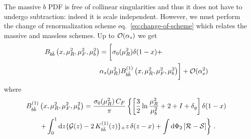 The massive $b$ PDF is free of collinear singularities and thus it
does
not have to
undergo subtraction: indeed it is scale independent.
However, we must perform the change of
renormalization scheme eq.~\eqref{eq:change-of-scheme} which relates
the massive and massless schemes.
Up to ${\cal O}(\alpha_s)$ we get
\begin{align}
  B_{b\bar{b}}\left(x,\mu_R^2,\mu_F^2 ,\mu_b^2\right) &= 
  \biggl[ \sigma_0(\mu_R^2) \delta(1-x) + \nonumber \\ &\alpha_s(\mu_R^2)
    B_{b\bar{b}}^{(1)}\left(x,\mu_R^2,\mu_F^2 ,\mu_b^2\right) \biggr]
  +{\cal O}(\alpha_s^2)
\end{align}
where
\begin{equation}
  \begin{split}
  B_{b\bar{b}}^{(1)}&\left(x,\mu_R^2,\mu_F^2 ,\mu_b^2\right) =
  \frac{\sigma_0(\mu_R^2)\,C_F}{\pi}
  \left\{
    \left[
      \frac{3}{2}\ln\frac{\mu_R^2}{\mu_b^2}+2 + I + \delta_g
    \right]\delta(1-x) \right.\\
  &\left.
   + \int_0^1{\rm d}z \{{\cal G}(z) - 2\,K_{b\bar{b}}^{(1)}(z)\}_+z\,\delta(z-x)
   +  \int{\rm d}\Phi_2 \left[{\cal R} -{\cal S}\right] \right\}\,.
  \end{split}
\end{equation}

